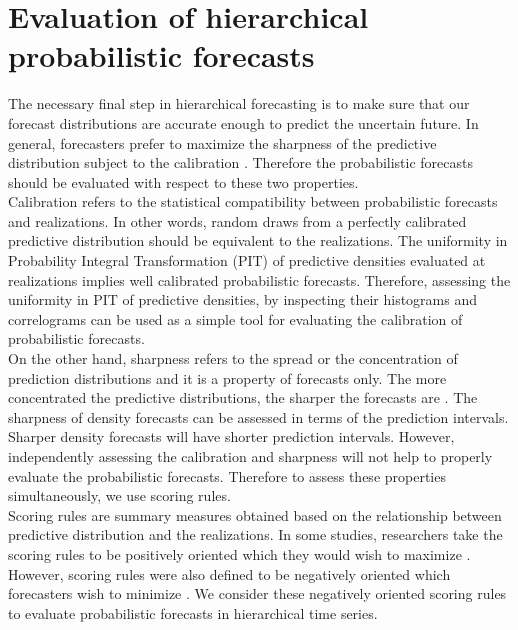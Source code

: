 \documentclass[a4paper, 11pt]{article}
\begin{document}
\section{Evaluation of hierarchical probabilistic forecasts}

The necessary final step in hierarchical forecasting is to make sure that our forecast distributions are accurate enough to predict the uncertain future. In general, forecasters prefer to maximize the sharpness of the predictive distribution subject to the calibration \citep{Gneiting2014}. Therefore the probabilistic forecasts should be evaluated with respect to these two properties.\\

\noindent
Calibration refers to the statistical compatibility between probabilistic forecasts and realizations. In other words, random draws from a perfectly calibrated predictive distribution should be equivalent to the realizations. The uniformity in Probability Integral Transformation (PIT) of predictive densities evaluated at realizations implies well calibrated probabilistic forecasts. Therefore, assessing the uniformity in PIT of predictive densities, by inspecting their histograms and correlograms can be used as a simple tool for evaluating the calibration of probabilistic forecasts.  \\

\noindent
On the other hand, sharpness refers to the spread or the concentration of prediction distributions and it is a property of forecasts only. The more concentrated the predictive distributions, the sharper the forecasts are \citep{Gneiting2008}. The sharpness of density forecasts can be assessed in terms of the prediction intervals. Sharper density forecasts will have shorter prediction intervals. However, independently assessing the calibration and sharpness will not help to properly evaluate the probabilistic forecasts. Therefore to assess these properties simultaneously, we use scoring rules. \\

\noindent
Scoring rules are summary measures obtained based on the relationship between predictive distribution and the realizations. In some studies, researchers take the scoring rules to be positively oriented which they would wish to maximize \citep{Gneiting2007}. However, scoring rules were also defined to be negatively oriented which forecasters wish to minimize \citep{Gneiting2014}. We consider these negatively oriented scoring rules to evaluate probabilistic forecasts in hierarchical time series. \\
\end{document}
